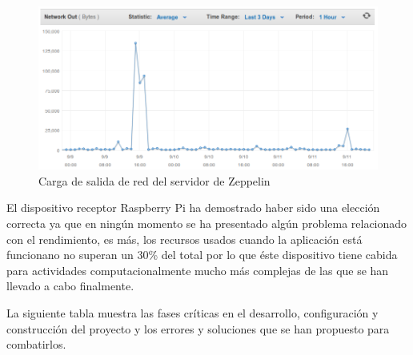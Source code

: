 \begin{figure}[ht]
  \begin{center}
    \includegraphics[scale=0.40]{../images/amazon/netzeppou.png}
    \caption{Carga de salida de red del servidor de Zeppelin}
    \label{fig:paquetes}
  \end{center}
\end{figure}

\newpage

El dispositivo receptor Raspberry Pi ha demostrado haber sido una elección correcta ya que en ningún momento se ha presentado algún problema relacionado con el rendimiento, es más, los recursos usados cuando la aplicación está funcionano no superan un 30\% del total por lo que éste dispositivo tiene cabida para actividades computacionalmente mucho más complejas de las que se han llevado a cabo finalmente.

\bigskip

La siguiente tabla muestra las fases críticas en el desarrollo, configuración y construcción del proyecto y los errores y soluciones que se han propuesto para combatirlos.

\newpage

